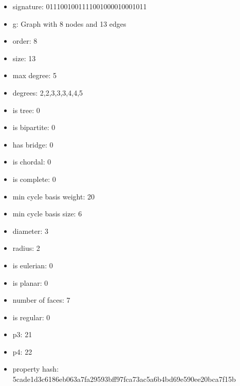 \begin{itemize}
\item signature: 0111001001111001000010001011
\item g: Graph with 8 nodes and 13 edges
\item order: 8
\item size: 13
\item max degree: 5
\item degrees: 2,2,3,3,3,4,4,5
\item is tree: 0
\item is bipartite: 0
\item has bridge: 0
\item is chordal: 0
\item is complete: 0
\item min cycle basis weight: 20
\item min cycle basis size: 6
\item diameter: 3
\item radius: 2
\item is eulerian: 0
\item is planar: 0
\item number of faces: 7
\item is regular: 0
\item p3: 21
\item p4: 22
\item property hash: 5cade1d3c6186eb063a7fa29593bff97fca73ac5a6b4bd69e590ee20bca7f15b
\end{itemize}
\newpage
\begin{figure}
\end{figure}
